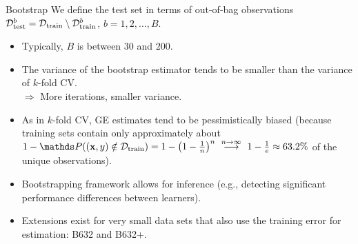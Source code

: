 \begin{vbframe}{Bootstrap}
We define the test set in terms of out-of-bag observations
$\mathcal{D}_{\text{test}}^b = \mathcal{D}_{\text{train}} \setminus \mathcal{D}_{\text{train}}^b$, $b = 1, 2, \dots, B$.

\framebreak

\begin{itemize}
  \item Typically, $B$ is between $30$ and $200$.
  \item The variance of the bootstrap estimator tends to be smaller than the
  variance of $k$-fold CV. \\
  $\Rightarrow$ More iterations, smaller variance.
  \item As in $k$-fold CV, GE estimates tend to be pessimistically biased
  (because training sets contain only approximately about $1 - \P((\xv, y) \notin \Dtrain) = 1 - \left(1 - \frac{1}{n}\right)^n 
  \ \stackrel{n \to \infty}{\longrightarrow} \ 1-\frac{1}{e} \approx 63.2 \%$ of the unique 
  observations).
  \item Bootstrapping framework allows for inference 
  (e.g., detecting significant performance differences between learners).
  \item Extensions exist for very small data sets that also use the training 
  error for  estimation: B632 and B632+.

\end{itemize}

\end{vbframe}


